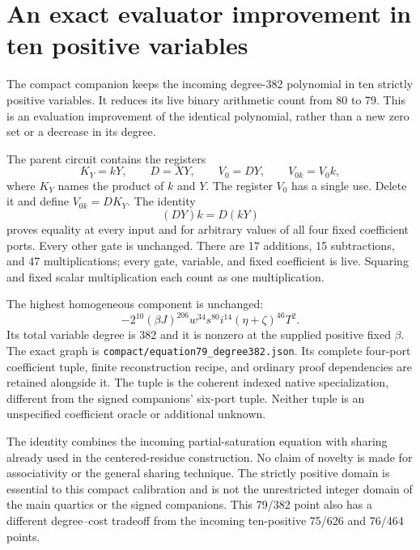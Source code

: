 

\section{An exact evaluator improvement in ten positive variables}
\label{sec:compact}
The compact companion keeps the incoming degree-382 polynomial in ten
strictly positive variables. It reduces its live binary arithmetic count
from 80 to 79. This is an evaluation improvement of the identical
polynomial, rather than a new zero set or a decrease in its degree.

The parent circuit contains the registers
\[
 K_Y=kY,\qquad D=XY,\qquad V_0=DY,\qquad V_{0k}=V_0k,
\]
where $K_Y$ names the product of $k$ and $Y$. The register $V_0$ has a single
use. Delete it and define $V_{0k}=DK_Y$. The identity
\[
 (DY)k=D(kY)
\]
proves equality at every input and for arbitrary values of all four fixed
coefficient ports. Every other gate is unchanged. There are 17 additions,
15 subtractions, and 47 multiplications; every gate, variable, and fixed
coefficient is live. Squaring and fixed scalar multiplication each count
as one multiplication.

The highest homogeneous component is unchanged:
\[
 -2^{10}(\beta J)^{206}w^{34}s^{80}i^{14}
 (\eta+\zeta)^{46}T^2.
\]
Its total variable degree is 382 and it is nonzero at the supplied positive
fixed $\beta$. The exact graph is
\texttt{compact/equation79\_degree382.json}. Its complete four-port
coefficient tuple, finite reconstruction recipe, and ordinary proof
dependencies are retained alongside it. The tuple is the coherent indexed
native specialization, different from the signed companions' six-port
tuple. Neither tuple is an unspecified coefficient oracle or additional
unknown.

The identity combines the incoming partial-saturation equation with
sharing already used in the centered-residue construction. No claim of
novelty is made for associativity or the general sharing technique. The
strictly positive domain is essential to this compact calibration and is
not the unrestricted integer domain of the main quartics or the signed
companions. This 79/382 point also has a different degree--cost tradeoff
from the incoming ten-positive 75/626 and 76/464 points.
